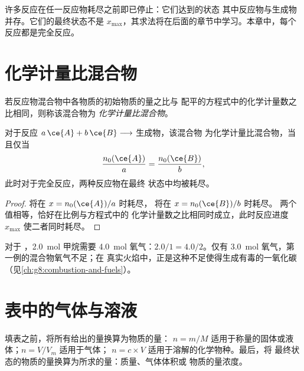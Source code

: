 \begin{remark}[并非所有反应都是完全反应]\label{rem:g10:reaction-progress-table:not-total}
许多反应在任一反应物耗尽之前即已停止：它们达到的状态
其中反应物与生成物并存。它们的最终状态不是
$x_{\max}$，其求法将在后面的章节中学习。本章中，每个
反应都是完全反应。
\end{remark}

\section{化学计量比混合物}

\begin{definition}[化学计量比混合物]\label{def:g10:reaction-progress-table:stoichiometric}
若反应物混合物中各物质的初始物质的量之比与
配平的方程式中的化学计量数之比相同，则称该混合物为
\emph{化学计量比混合物}。
\end{definition}

\begin{proposition}[所有反应物同时耗尽]\label{prop:g10:reaction-progress-table:together}
对于反应 $a\,\ce{A} + b\,\ce{B} \longrightarrow$ 生成物，该混合物
为化学计量比混合物，当且仅当
\[
  \frac{n_0(\ce{A})}{a} = \frac{n_0(\ce{B})}{b},
\]
此时对于完全反应，两种反应物在最终
状态中均被耗尽。
\end{proposition}

\begin{proof}
 将在 $x = n_0(\ce{A})/a$ 时耗尽， 将在 $x = n_0(\ce{B})/b$ 时耗尽。
两个值相等，恰好在比例与方程式中的
化学计量数之比相同时成立，此时反应进度 $x_{\max}$ 使二者同时耗尽。
\end{proof}

\begin{example}[甲烷的充分燃烧]\label{ex:g10:reaction-progress-table:stoich}
对于 ，\qty{2.0}{mol} 甲烷需要
\qty{4.0}{mol} 氧气：$2.0/1 = 4.0/2$。仅有 \qty{3.0}{mol}
氧气，第一例的混合物氧气不足；在
真实火焰中，正是这种不足使得生成有毒的一氧化碳
（见\cref{ch:g8:combustion-and-fuels}）。
\end{example}

\section{表中的气体与溶液}


\begin{method}[初始状态的物质的量]\label{met:g10:reaction-progress-table:amounts}
填表之前，将所有给出的量换算为物质的量：
$n = m/M$ 适用于称量的固体或液体；$n = V/V_m$ 适用于气体；
$n = c \times V$ 适用于溶解的化学物种。最后，将
最终状态的物质的量换算为所求的量：质量、气体体积或
物质的量浓度。
\end{method}

